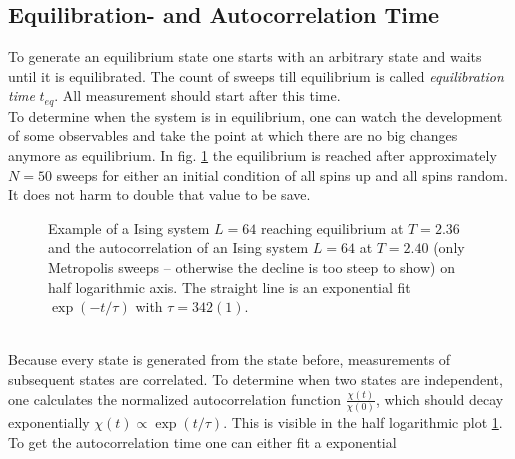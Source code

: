 \subsection{Equilibration- and Autocorrelation Time}
\label{ssec:eqtime}
    To generate an equilibrium state one starts with an arbitrary state
    and waits until it is equilibrated. The count of sweeps till
    equilibrium is called \emph{equilibration time} \(t_{eq}\).
    All measurement should start after this time.\\
    To determine when the system is in equilibrium, one can watch the
    development of some observables and take the point at which there
    are no big changes anymore as equilibrium. In fig.
    \ref{fig:equiandauto}
    the equilibrium is reached after approximately \(N=50\) sweeps for
    either an initial condition of all spins up and all spins random. It
    does not harm to double that value to be save.
    \begin{figure}[htbp]
        \centering
        \caption[Examples for equilibration and autocorrelation]
        {
             Example of a Ising system
                \(L=64\) reaching equilibrium at \(T=2.36\) and
             the autocorrelation of an
                Ising system \(L=64\) at \(T=2.40\) (only Metropolis
                sweeps -- otherwise the decline is too steep to show)
                on half logarithmic axis.
                The straight line is an exponential fit \(\exp(-t/\tau)\)
                with \(\tau = 342(1)\).
        }
        \label{fig:equiandauto}
    \end{figure}\\
    Because every state is generated from the state before, measurements
    of subsequent states are correlated. To determine when two states
    are independent, one calculates the normalized autocorrelation function
    \(\frac{\chi(t)}{\chi(0)}\), which should decay exponentially
    \(\chi(t) \propto \exp(t/\tau)\). This is visible in the half
    logarithmic plot \ref{fig:equiandauto}.
    To get the autocorrelation time one can either fit a exponential
